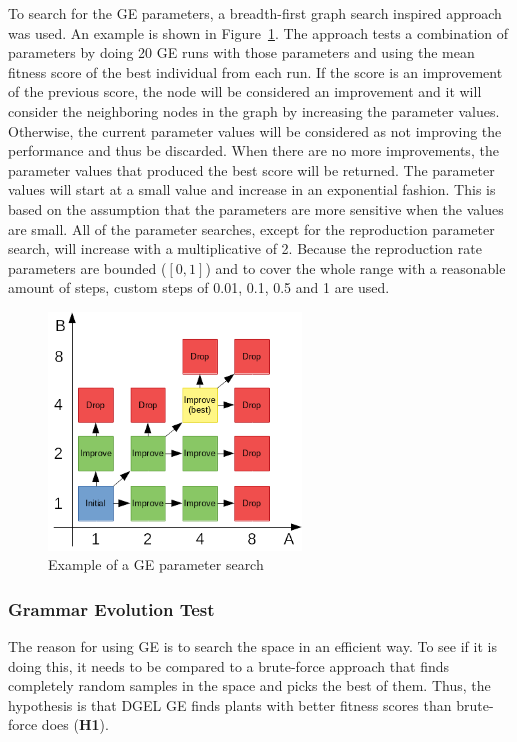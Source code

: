 To search for the GE parameters, a breadth-first graph search inspired approach was used.
An example is shown in Figure~\ref{fig:parameter-search}.
The approach tests a combination of parameters by doing 20 GE runs with those parameters and using the mean fitness score of the best individual from each run.
If the score is an improvement of the previous score, the node will be considered an improvement and it will consider the neighboring nodes in the graph by increasing the parameter values.
Otherwise, the current parameter values will be considered as not improving the performance and thus be discarded.
When there are no more improvements, the parameter values that produced the best score will be returned.
The parameter values will start at a small value and increase in an exponential fashion.
This is based on the assumption that the parameters are more sensitive when the values are small.
All of the parameter searches, except for the reproduction parameter search, will increase with a multiplicative of 2.
Because the reproduction rate parameters are bounded ($[0, 1]$) and to cover the whole range with a reasonable amount of steps, custom steps of 0.01, 0.1, 0.5 and 1 are used.

\begin{figure}
    \centering
    \includegraphics[width=0.6\textwidth]{figures/parameter-search}
    \caption{Example of a GE parameter search}
    \label{fig:parameter-search}
\end{figure}

\subsubsection{Grammar Evolution Test}
The reason for using GE is to search the space in an efficient way.
To see if it is doing this, it needs to be compared to a brute-force approach that finds completely random samples in the space and picks the best of them.
Thus, the hypothesis is that DGEL GE finds plants with better fitness scores than brute-force does (\textbf{H1}).


